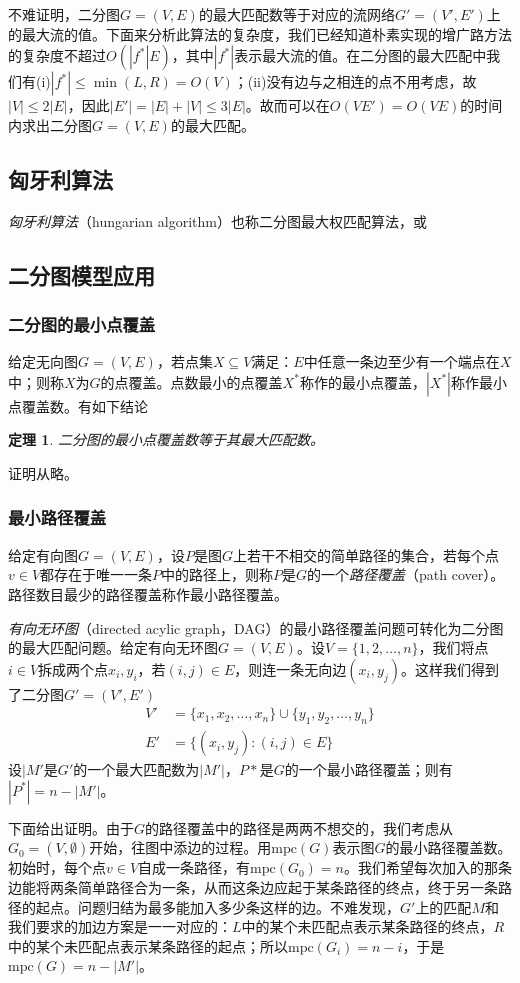 \documentclass[a4paper]{ctexbook}
\newtheorem{theorem}{定理}[chapter] %
\newcommand{\mpc}{\mathrm{mpc}}
\begin{document}
  不难证明，二分图$G=(V,E)$的最大匹配数等于对应的流网络$G'=(V',E')$上的最大流的值。下面来分析此算法的复杂度，我们已经知道朴素实现的增广路方法的复杂度不超过$O(|f^*|E)$，其中$|f^*|$表示最大流的值。在二分图的最大匹配中我们有(i)$|f^*|\le\min(L,R)=O(V)$；(ii)没有边与之相连的点不用考虑，故$|V|\le 2|E|$，因此$|E'|=|E|+|V|\le3|E|$。故而可以在$O(VE')=O(VE)$的时间内求出二分图$G=(V,E)$的最大匹配。
  \subsection{匈牙利算法}
  \emph{匈牙利算法}（hungarian algorithm）也称二分图最大权匹配算法，或
  \subsection{二分图模型应用}
  \subsubsection*{二分图的最小点覆盖}
  给定无向图$G=(V,E)$，若点集$X\subseteq V$满足：$E$中任意一条边至少有一个端点在$X$中；则称$X$为$G$的点覆盖。点数最小的点覆盖$X^*$称作的最小点覆盖，$|X^*|$称作最小点覆盖数。有如下结论
  \begin{theorem}
    二分图的最小点覆盖数等于其最大匹配数。
  \end{theorem}
  证明从略。
  \subsubsection*{最小路径覆盖}
  给定有向图$G=(V,E)$，设$P$是图$G$上若干不相交的简单路径的集合，若每个点$v\in V$都存在于唯一一条$P$中的路径上，则称$P$是$G$的一个\emph{路径覆盖}（path cover）。路径数目最少的路径覆盖称作最小路径覆盖。

  \emph{有向无环图}（directed acylic graph，DAG）的最小路径覆盖问题可转化为二分图的最大匹配问题。给定有向无环图$G=(V,E)$。设$V=\{1,2,\dots,n\}$，我们将点$i\in V$拆成两个点$x_i, y_i$，若$(i,j)\in E$，则连一条无向边$(x_i, y_j)$。这样我们得到了二分图$G'=(V',E')$
  \begin{align*}
    V'&=\{x_1, x_2, \dots, x_n\} \cup \{y_1, y_2, \dots, y_n\}\\
    E'&=\{(x_i,y_j)\colon (i,j)\in E\}
  \end{align*}
  设$|M'$是$G'$的一个最大匹配数为$|M'|$，$P*$是$G$的一个最小路径覆盖；则有$|P^*|=n-|M'|$。

  下面给出证明。由于$G$的路径覆盖中的路径是两两不想交的，我们考虑从$G_0=(V,\emptyset)$开始，往图中添边的过程。用$\mpc(G)$表示图$G$的最小路径覆盖数。初始时，每个点$v\in V$自成一条路径，有$\mpc(G_0)=n$。我们希望每次加入的那条边能将两条简单路径合为一条，从而这条边应起于某条路径的终点，终于另一条路径的起点。问题归结为最多能加入多少条这样的边。不难发现，$G'$上的匹配$M$和我们要求的加边方案是一一对应的：$L$中的某个未匹配点表示某条路径的终点，$R$中的某个未匹配点表示某条路径的起点；所以$\mpc(G_i)=n-i$，于是$\mpc(G)=n-|M'|$。
\end{document}
